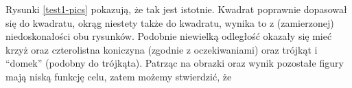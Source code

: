 \documentclass[a4paper,12pt,leqno]{article}
\begin{document}
Rysunki \ref{test1-pics} pokazują, że tak jest istotnie. Kwadrat poprawnie dopasował się do kwadratu, okrąg niestety także do kwadratu, wynika to z (zamierzonej) niedoskonałości obu rysunków.
Podobnie niewielką odległość okazały się mieć krzyż oraz czterolistna koniczyna (zgodnie z oczekiwaniami) oraz trójkąt i ``domek'' (podobny do trójkąta).
Patrząc na obrazki oraz wynik pozostałe figury mają niską funkcję celu, zatem możemy stwierdzić, że

\begin{figure}\centering
{}\hspace{1mm}
\hspace{1mm}
\hspace{1mm}
\hspace{1mm}
\hspace{1mm}

\end{figure}
\end{document}
